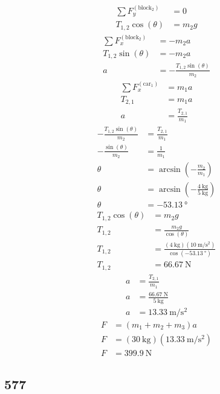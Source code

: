 \documentclass{article}
\begin{document}
\begin{align*}
	\sum F_y^{(\text{block}_2)} & = 0 \\
	T_{1, 2}\cos(\theta) & = m_2g
\end{align*}
\begin{align*}
	\sum F_x^{(\text{block}_2)} & = -m_2a \\
	T_{1, 2}\sin(\theta) & = -m_2a \\
	a & = -\frac{T_{1, 2}\sin(\theta)}{m_2}
\end{align*}
\begin{align*}
	\sum F_x^{(\text{car}_1)} & = m_1a \\
	T_{2, 1} & = m_1a \\
	a & = \frac{T_{2, 1}}{m_1}
\end{align*}
\begin{align*}
	-\frac{T_{1, 2}\sin(\theta)}{m_2} & = \frac{T_{2, 1}}{m_1} \\
	-\frac{\sin(\theta)}{m_2} & = \frac{1}{m_1} \\
	\theta & = \arcsin \left( -\frac{m_2}{m_1} \right) \\
	\theta & = \arcsin \left( -\frac{\SI{4}{\kilogram}}{\SI{5}{\kilogram}} \right) \\
	\theta & = -\SI{53.13}{\degree}
\end{align*}
\begin{align*}
	T_{1, 2}\cos(\theta) & = m_2g \\
	T_{1, 2} & = \frac{m_2g}{\cos(\theta)} \\
	T_{1, 2} & = \frac{(\SI{4}{\kilogram})(\SI{10}{\meter \per \second \squared})}{\cos(-\SI{53.13}{\degree})} \\
	T_{1, 2} & = \SI{66.67}{\newton}
\end{align*}
\begin{align*}
	a & = \frac{T_{2, 1}}{m_1} \\
	a & = \frac{\SI{66.67}{\newton}}{\SI{5}{\kilogram}} \\
	a & = \SI{13.33}{\meter \per \second \squared}
\end{align*}
\begin{align*}
	F & = (m_1 + m_2 + m_3)a \\
	F & = (\SI{30}{\kilogram})(\SI{13.33}{\meter \per \second \squared}) \\
	F & = \SI{399.9}{\newton}
\end{align*}

\subsection{577}
\end{document}
